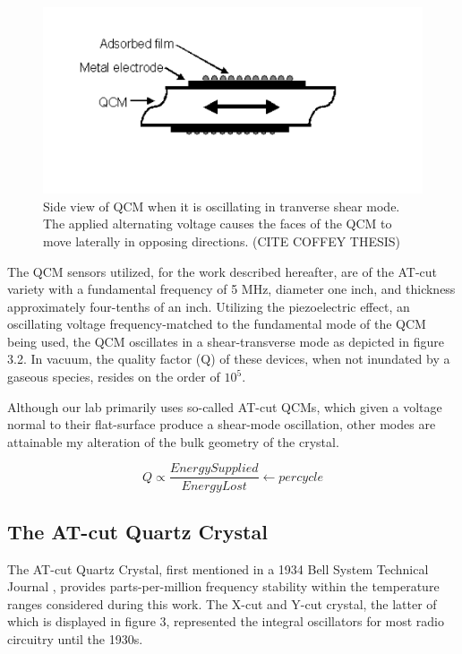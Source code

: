 \begin{figure}[hbtp]
	\centering
	\includegraphics[width=1.0\textwidth]{Chapter-2/fig2_QCM_side}
	\caption{Side view of QCM when it is oscillating in tranverse shear mode. The applied alternating voltage causes the faces of the QCM to move laterally in opposing directions. (CITE COFFEY THESIS)}
	\label{fig2:QCM fig 2}
\end{figure}




The QCM sensors utilized, for the work described hereafter, are of the AT-cut variety with a fundamental frequency of 5 MHz, diameter one inch, and thickness approximately four-tenths of an inch. Utilizing the piezoelectric effect, an oscillating voltage frequency-matched to the fundamental mode of the QCM being used, the QCM oscillates in a shear-transverse mode as depicted in figure 3.2. In vacuum, the quality factor (Q) of these devices, when not inundated by a gaseous species, resides on the order of $10^{5}$. 

Although our lab primarily uses so-called AT-cut QCMs, which given a voltage normal to their flat-surface produce a shear-mode oscillation, other modes are attainable my alteration of the bulk geometry of the crystal. 

\begin{equation}
Q \propto \frac{Energy Supplied}{Energy Lost} \leftarrow per  cycle
\label{ch2-eq:one}
\end{equation}


\subsection{The AT-cut Quartz Crystal}

The AT-cut Quartz Crystal, first mentioned in a 1934 Bell System Technical Journal \cite{211}, provides parts-per-million frequency stability within the temperature ranges considered during this work. The X-cut and Y-cut crystal, the latter of which is displayed in figure 3, represented the integral oscillators for most radio circuitry until the 1930s. 

